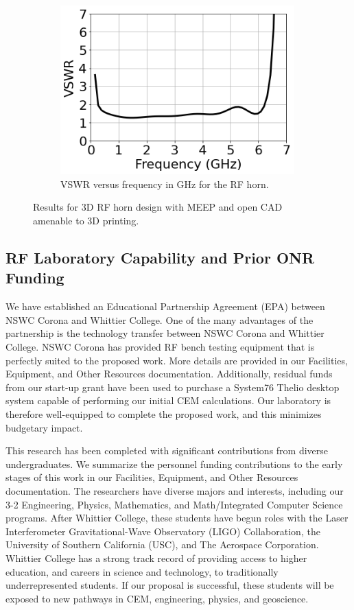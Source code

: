 \documentclass[10pt]{amsart}
\theoremstyle{definition}
\numberwithin{equation}{section}
\begin{document}
\begin{figure}[ht]
\begin{subfigure}{0.65\textwidth}
\end{subfigure}
\hfill
\begin{subfigure}{0.3\textwidth}
    \includegraphics[width=0.99\textwidth]{figures/vswr.png}
	\caption{VSWR versus frequency in GHz for the RF horn.}
\end{subfigure}
\caption{Results for 3D RF horn design with MEEP and open CAD amenable to 3D printing.}
\label{fig:3d_cad}
\end{figure}

\subsection{RF Laboratory Capability and Prior ONR Funding}

We have established an Educational Partnership Agreement (EPA) between NSWC Corona and Whittier College.  One of the many advantages of the partnership is the technology transfer between NSWC Corona and Whittier College.  NSWC Corona has provided RF bench testing equipment that is perfectly suited to the proposed work.  More details are provided in our Facilities, Equipment, and Other Resources documentation.  Additionally, residual funds from our start-up grant have been used to purchase a System76 Thelio desktop system capable of performing our initial CEM calculations.  Our laboratory is therefore well-equipped to complete the proposed work, and this minimizes budgetary impact.  

This research has been completed with significant contributions from diverse undergraduates.  We summarize the personnel funding contributions to the early stages of this work in our Facilities, Equipment, and Other Resources documentation.  The researchers have diverse majors and interests, including our 3-2 Engineering, Physics, Mathematics, and Math/Integrated Computer Science programs.   After Whittier College, these students have begun roles with the Laser Interferometer Gravitational-Wave Observatory (LIGO) Collaboration, the University of Southern California (USC), and The Aerospace Corporation.  Whittier College has a strong track record of providing access to higher education, and careers in science and technology, to traditionally underrepresented students.  If our proposal is successful, these students will be exposed to new pathways in CEM, engineering, physics, and geoscience.
\end{document}
